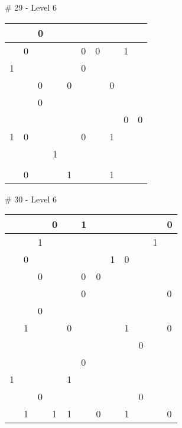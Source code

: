 \# 29 - Level 6 \newline
\begin{tabular}{|m{\collen}|m{\collen}|m{\collen}|m{\collen}|m{\collen}|m{\collen}|m{\collen}|m{\collen}|m{\collen}|m{\collen}|}
\hline
    &   & 0 &   &   &   &   &   &   &   \\
\hline
    & 0 &   &   &   & 0 & 0 &   & 1 &   \\
\hline
  1 &   &   &   &   & 0 &   &   &   &   \\
\hline
    &   & 0 &   & 0 &   &   & 0 &   &   \\
\hline
    &   & 0 &   &   &   &   &   &   &   \\
\hline
    &   &   &   &   &   &   &   & 0 & 0 \\
\hline
  1 & 0 &   &   &   & 0 &   & 1 &   &   \\
\hline
    &   &   & 1 &   &   &   &   &   &   \\
\hline
    &   &   &   &   &   &   &   &   &   \\
\hline
    & 0 &   &   & 1 &   &   & 1 &   &   \\
\hline
\end{tabular}


\medskip

\# 30 - Level 6 \newline
\begin{tabular}{|m{\collen}|m{\collen}|m{\collen}|m{\collen}|m{\collen}|m{\collen}|m{\collen}|m{\collen}|m{\collen}|m{\collen}|m{\collen}|m{\collen}|}
\hline
    &   &   & 0 &   & 1 &   &   &   &   &   & 0 \\
\hline
    &   & 1 &   &   &   &   &   &   &   & 1 &   \\
\hline
    & 0 &   &   &   &   &   & 1 & 0 &   &   &   \\
\hline
    &   & 0 &   &   & 0 & 0 &   &   &   &   &   \\
\hline
    &   &   &   &   & 0 &   &   &   &   &   & 0 \\
\hline
    &   & 0 &   &   &   &   &   &   &   &   &   \\
\hline
    & 1 &   &   & 0 &   &   &   & 1 &   &   & 0 \\
\hline
    &   &   &   &   &   &   &   &   & 0 &   &   \\
\hline
    &   &   &   &   & 0 &   &   &   &   &   &   \\
\hline
  1 &   &   &   & 1 &   &   &   &   &   &   &   \\
\hline
    &   & 0 &   &   &   &   &   &   & 0 &   &   \\
\hline
    & 1 &   & 1 & 1 &   & 0 &   & 1 &   &   & 0 \\
\hline
\end{tabular}


